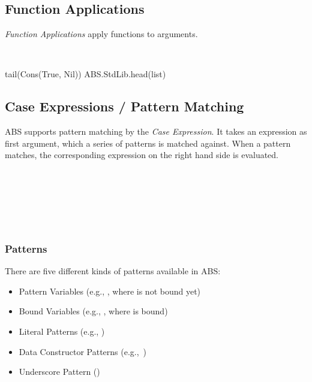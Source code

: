 \subsection{Function Applications}
\emph{Function Applications} apply functions to arguments.

\begin{abssyntax}
  {}\ \TRS{(}  \TRS{)}   
\end{abssyntax}

\begin{absexample}
tail(Cons(True, Nil))
ABS.StdLib.head(list)
\end{absexample}

\subsection{Case Expressions / Pattern Matching}
ABS supports pattern matching by the \emph{Case Expression}.
It takes an expression as first argument, which a series of patterns is matched against.
When a pattern matches, the corresponding expression on the right hand side is evaluated.

\begin{abssyntax}
        {}\ \ \TRS{\{} \ \TRS{\}}\\
     {}\ \TRS{=>}\ \ \TRS{;}\\
        {}
                  {}
                  {}
                  \TRS{\_}\\
  {}\ \\
    {}\ 
\end{abssyntax}


\subsubsection{Patterns}
There are five different kinds of patterns available in ABS:
\begin{itemize}
\item Pattern Variables (e.g., , where  is not bound yet)
\item Bound Variables (e.g., , where  is bound)
\item Literal Patterns (e.g., )
\item Data Constructor Patterns (e.g.,~)
\item Underscore Pattern (\absinline{_})
\end{itemize}

